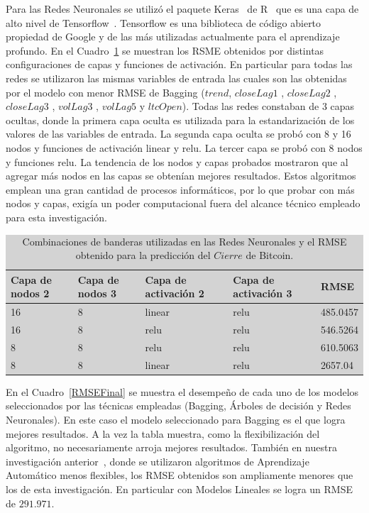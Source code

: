 \documentclass[a4paper,12pt,twocolumn]{article}
\begin{document}
Para las Redes Neuronales se utilizó el paquete Keras~\cite{keras} de R~\cite{r} que es una capa de alto nivel de Tensorflow~\cite{tensorflow}. Tensorflow es una biblioteca de código abierto propiedad de Google y de las más utilizadas actualmente para el aprendizaje profundo. En el Cuadro~\ref{redesModelTuning} se muestran los RSME obtenidos por distintas configuraciones de capas y funciones de activación. En particular para todas las redes se utilizaron las mismas variables de entrada  las cuales son las obtenidas por el modelo con menor RMSE de Bagging ($trend$, $closeLag1$ , $closeLag2$ , $closeLag3$ ,  $volLag3$ , $volLag5$ y $ltcOpen$). Todas las redes constaban de 3 capas ocultas, donde la primera capa oculta es utilizada para la estandarización de los valores de las variables de entrada. La segunda capa oculta se probó con 8 y 16 nodos y funciones de activación linear y relu. La  tercer capa se probó con 8 nodos y funciones relu. La tendencia de los nodos y capas probados mostraron que al agregar más nodos en las capas se obtenían mejores resultados. Estos algoritmos emplean una gran cantidad de procesos informáticos, por lo que probar con más nodos y capas, exigía un poder computacional fuera del alcance técnico empleado para esta investigación. 


\begin{table}[!hbt]
\centering
\caption{Combinaciones de banderas utilizadas en las Redes Neuronales y el RMSE obtenido para la predicción del $Cierre$ de Bitcoin. }
\label{redesModelTuning}
\begingroup\setlength{\fboxsep}{0pt}
\colorbox{lightgray}{%
\begin{tabular}{|l|l|l|l|l|}
\hline Capa de nodos 2 & Capa de nodos 3 & Capa de activación 2 & Capa de activación 3 & RMSE \\
\hline 16& 8 & linear & relu  &  485.0457\\
\hline 16& 8 & relu & relu  &  546.5264\\
\hline 8& 8 & relu & relu  &  610.5063\\
\hline 8& 8 & linear & relu  & 2657.04\\
\hline
\end{tabular}%
}\endgroup
\end{table}

En el Cuadro~\ref{RMSEFinal} se muestra el desempeño de cada uno de los modelos seleccionados por las técnicas empleadas (Bagging, Árboles de decisión y Redes Neuronales). En este caso el modelo seleccionado para Bagging es el que logra mejores resultados. A la vez la tabla muestra, como la flexibilización del algoritmo, no necesariamente arroja mejores resultados. También en nuestra investigación anterior~\cite{paper1}, donde se utilizaron algoritmos de Aprendizaje Automático menos flexibles, los RMSE obtenidos son ampliamente menores que los de esta investigación. En particular con Modelos Lineales se logra un RMSE de $291.971$.
\end{document}
